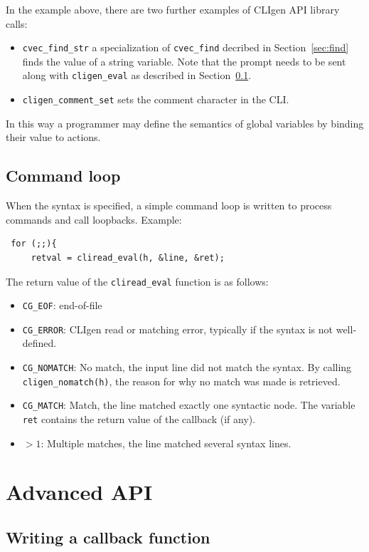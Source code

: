 \documentclass[a4paper, 10pt] {article}
\begin{document}
In the example above, there are two further examples of CLIgen API library calls: 
\begin{itemize}
\item
{\tt cvec\_find\_str} a specialization of {\tt cvec\_find} decribed in Section~\ref{sec:find} finds the value of a string variable.  Note that the prompt needs to be sent along with {\tt cligen\_eval} as described in Section~\ref{sec:main}.
\item
{\tt cligen\_comment\_set} sets the comment character in the CLI.
\end{itemize}

In this way a programmer may define the semantics of global variables
by binding their value to actions.

\subsection{Command loop}
\label{sec:main}
When the syntax is specified, a simple command loop is written to
process commands and call loopbacks.
Example:
\begin{verbatim}
 for (;;){
     retval = cliread_eval(h, &line, &ret);
\end{verbatim}
The return value of the {\tt cliread\_eval} function is as follows:
\begin{itemize}
\item {\tt CG\_EOF}: end-of-file
\item {\tt CG\_ERROR}: CLIgen read or matching error, typically if the syntax is not well-defined.
\item {\tt CG\_NOMATCH}: No match, the input line did not match the syntax. By calling {\tt cligen\_nomatch(h)}, the reason for why no match was made is retrieved.
\item {\tt CG\_MATCH}: Match, the line matched exactly one syntactic node. The variable {\tt ret} contains the return value of the callback (if any).
\item $> 1$: Multiple matches, the line matched several syntax lines.
\end{itemize}

\section{Advanced API}

\subsection{Writing a callback function}
\end{document}
